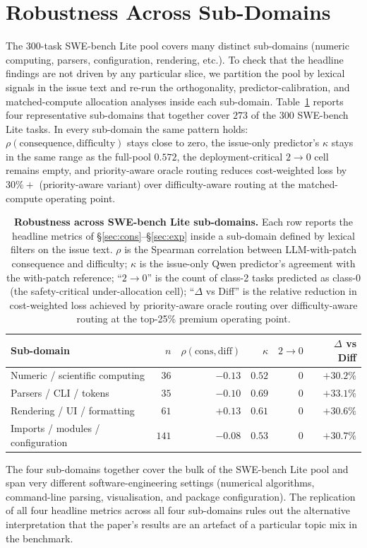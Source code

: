 \documentclass{article}
\begin{document}
\section{Robustness Across Sub-Domains}
\label{app:subdomain}

The 300-task SWE-bench Lite pool covers many distinct sub-domains
(numeric computing, parsers, configuration, rendering, etc.). To check
that the headline findings are not driven by any particular slice, we
partition the pool by lexical signals in the issue text and re-run the
orthogonality, predictor-calibration, and matched-compute allocation
analyses inside each sub-domain. Table~\ref{tab:subdomain} reports
four representative sub-domains that together cover $273$ of the $300$
SWE-bench Lite tasks. In every sub-domain the same pattern holds:
$\rho(\mathrm{consequence}, \mathrm{difficulty})$ stays close to zero,
the issue-only predictor's $\kappa$ stays in the same range as the
full-pool $0.572$, the deployment-critical $2{\to}0$ cell remains
empty, and priority-aware oracle routing reduces cost-weighted loss by
$30\%+$ (priority-aware variant) over difficulty-aware routing at
the matched-compute operating point.

\begin{table}[h]
\centering
\caption{\textbf{Robustness across SWE-bench Lite sub-domains.} Each
row reports the headline metrics of \S\ref{sec:cons}--\S\ref{sec:exp}
inside a sub-domain defined by lexical filters on the issue text.
$\rho$ is the Spearman correlation between LLM-with-patch consequence
and difficulty; $\kappa$ is the issue-only Qwen predictor's agreement
with the with-patch reference; ``$2{\to}0$'' is the count of class-2
tasks predicted as class-0 (the safety-critical under-allocation cell);
``$\Delta$ vs Diff'' is the relative reduction in cost-weighted loss
achieved by priority-aware oracle routing over difficulty-aware
routing at the top-25\% premium operating point.}
\label{tab:subdomain}
\small
\begin{tabular}{lrrrrr}
\toprule
Sub-domain & $n$ & $\rho(\mathrm{cons}, \mathrm{diff})$ & $\kappa$ & $2{\to}0$ & $\Delta$ vs Diff \\
\midrule
Numeric / scientific computing       & $\phantom{0}36$  & $-0.13$ & $0.52$ & $0$ & $+30.2\%$ \\
Parsers / CLI / tokens               & $\phantom{0}35$  & $-0.10$ & $0.69$ & $0$ & $+33.1\%$ \\
Rendering / UI / formatting          & $\phantom{0}61$  & $+0.13$ & $0.61$ & $0$ & $+30.6\%$ \\
Imports / modules / configuration    & $141$ & $-0.08$ & $0.53$ & $0$ & $+30.7\%$ \\
\bottomrule
\end{tabular}
\end{table}

The four sub-domains together cover the bulk of the SWE-bench Lite
pool and span very different software-engineering settings (numerical
algorithms, command-line parsing, visualisation, and package
configuration). The replication of all four headline metrics across
all four sub-domains rules out the alternative interpretation that
the paper's results are an artefact of a particular topic mix in the
benchmark.
\end{document}

